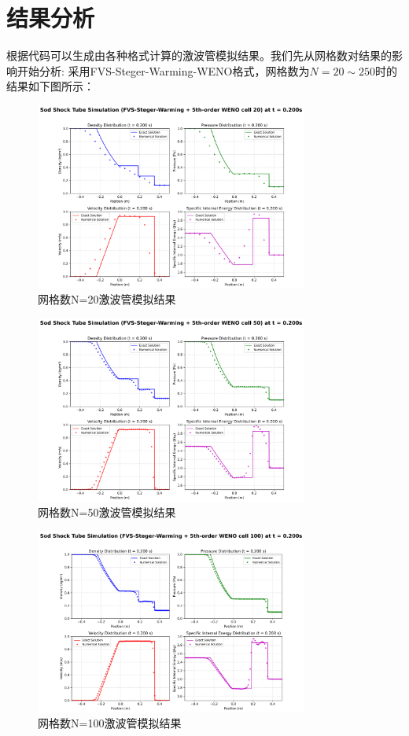 \documentclass[12pt,a4paper]{article}
\begin{document}
\section{结果分析}
根据代码可以生成由各种格式计算的激波管模拟结果。我们先从网格数对结果的影响开始分析:
采用FVS-Steger-Warming-WENO格式，网格数为$N=20\sim250$时的结果如下图所示：
\begin{figure}[!htbp]
    \centering
    \includegraphics[width=0.8\textwidth]{FVS-Steger-Warming + 5th-order WENO cell 20_t_0p200s.png}
    \caption{网格数N=20激波管模拟结果}
\end{figure}
\begin{figure}[!htbp]
    \centering
    \includegraphics[width=0.8\textwidth]{FVS-Steger-Warming + 5th-order WENO cell 50_t_0p200s.png}
    \caption{网格数N=50激波管模拟结果}
\end{figure}
\begin{figure}[!htbp]
    \centering
    \includegraphics[width=0.8\textwidth]{FVS-Steger-Warming + 5th-order WENO cell 100_t_0p200s.png}
    \caption{网格数N=100激波管模拟结果}
\end{figure}
\end{document}
